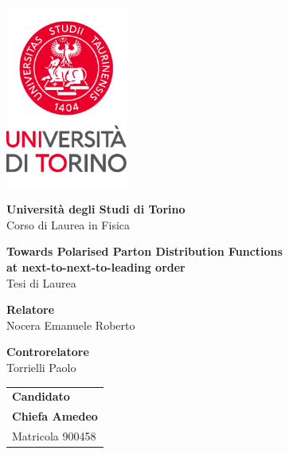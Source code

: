 \begin{titlepage}
  \centering
  \vspace*{0.5cm}

  \includegraphics[width=0.3\textwidth]{./images/newlogo.pdf}

  \vspace{1.5cm}

  \LARGE
  \textbf{Università degli Studi di Torino}\\

  \vspace{1mm}
  Corso di Laurea in Fisica
        
  \vspace{2cm}

  \textbf{Towards Polarised Parton Distribution Functions}\\
  \textbf{at next-to-next-to-leading order}\\
  Tesi di Laurea\\

  \vfill

  \raggedright

  \large

  \textbf{Relatore}\\
  Nocera Emanuele Roberto\\

  \vspace{10mm}

  \textbf{Controrelatore}\\
  Torrielli Paolo\\

  \vspace{5mm}

  \begin{flushright}
    \begin{tabular}{@{}l@{}}
      \textbf{Candidato}\\
      \textbf{Chiefa Amedeo}\\
      Matricola 900458
      \end{tabular}
  \end{flushright}


\end{titlepage}